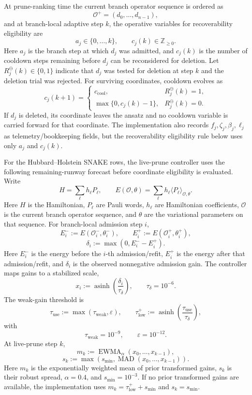 \documentclass[
  reprint,
  amsmath,
  amssymb,
  aps,
  pra,
  nofootinbib,
  superscriptaddress,
  floatfix
]{revtex4-2}
\begin{document}
At prune-ranking time the current branch operator sequence is ordered as
\[
\mathcal O^{+}=(d_0,\ldots,d_{n-1}),
\]
and at branch-local adaptive step \(k\), the operative variables for recoverability eligibility are
\[
a_j\in\{0,\ldots,k\},
\qquad
c_j(k)\in\mathbb Z_{\ge0}.
\]
Here \(a_j\) is the branch step at which \(d_j\) was admitted, and \(c_j(k)\) is the number of cooldown steps remaining before \(d_j\) can be reconsidered for deletion.  Let \(R_j^\ominus(k)\in\{0,1\}\) indicate that \(d_j\) was tested for deletion at step \(k\) and the deletion trial was rejected.  For surviving coordinates, cooldown evolves as
\[
c_j(k+1)
=
\begin{cases}
c_{\mathrm{cool}}, & R_j^\ominus(k)=1,\\
\max\{0,c_j(k)-1\}, & R_j^\ominus(k)=0.
\end{cases}
\]
If \(d_j\) is deleted, its coordinate leaves the ansatz and no cooldown variable is carried forward for that coordinate.  The implementation also records \(f_j,\zeta_j,\beta_j,\ell_j\) as telemetry/bookkeeping fields, but the recoverability eligibility rule below uses only \(a_j\) and \(c_j(k)\).

For the Hubbard--Holstein SNAKE rows, the live-prune controller uses the following remaining-runway forecast before coordinate eligibility is evaluated.  Write
\[
H=\sum_{\ell}h_{\ell}P_{\ell},
\qquad
E(\mathcal O,\theta)
=
\sum_{\ell}h_{\ell}
\langle P_{\ell}\rangle_{\mathcal O,\theta}.
\]
Here \(H\) is the Hamiltonian, \(P_{\ell}\) are Pauli words, \(h_{\ell}\) are Hamiltonian coefficients, \(\mathcal O\) is the current branch operator sequence, and \(\theta\) are the variational parameters on that sequence.  For branch-local admission step \(i\),
\[
E_i^{-}:=E(\mathcal O_i^{-},\theta_i^{-}),
\qquad
E_i^{+}:=E(\mathcal O_i^{+},\theta_i^{+}),
\]
\[
\delta_i:=\max(0,E_i^{-}-E_i^{+}).
\]
Here \(E_i^{-}\) is the energy before the \(i\)-th admission/refit, \(E_i^{+}\) is the energy after that admission/refit, and \(\delta_i\) is the observed nonnegative admission gain.  The controller maps gains to a stabilized scale,
\[
x_i:=\operatorname{asinh}\!\left(\frac{\delta_i}{\tau_\delta}\right),
\qquad
\tau_\delta=10^{-6}.
\]
The weak-gain threshold is
\[
\tau_{\mathrm{use}}:=\max(\tau_{\mathrm{weak}},\varepsilon),
\qquad
\tau_{\mathrm{low}}^{+}
:=
\operatorname{asinh}\!\left(\frac{\tau_{\mathrm{use}}}{\tau_\delta}\right),
\]
with
\[
\tau_{\mathrm{weak}}=10^{-9},
\qquad
\varepsilon=10^{-12}.
\]
At live-prune step \(k\),
\[
m_k:=\operatorname{EWMA}_{\alpha}(x_0,\ldots,x_{k-1}),
\]
\[
s_k:=\max\!\left(
s_{\min},\operatorname{MAD}(x_0,\ldots,x_{k-1})
\right).
\]
Here \(m_k\) is the exponentially weighted mean of prior transformed gains, \(s_k\) is their robust spread, \(\alpha=0.4\), and \(s_{\min}=10^{-3}\).  If no prior transformed gains are available, the implementation uses \(m_k=\tau_{\mathrm{low}}^{+}+s_{\min}\) and \(s_k=s_{\min}\).
\end{document}
